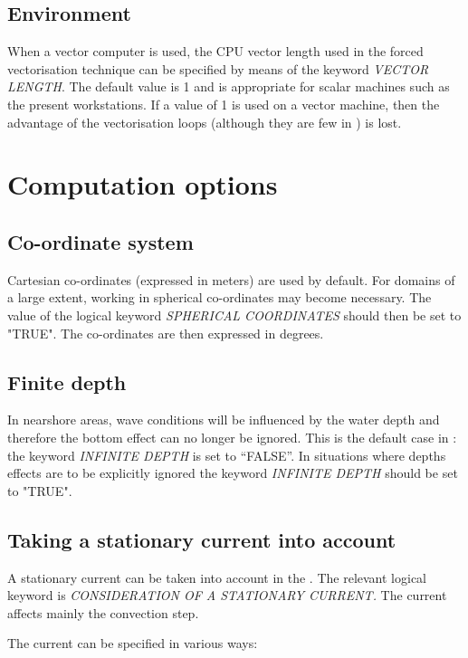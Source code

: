 \subsection{ Environment}

 When a vector computer is used, the CPU vector length used in the forced vectorisation technique can be specified by means of the keyword \textit{VECTOR LENGTH}. The default value is 1 and is appropriate for scalar machines such as the present workstations. If a value of 1 is used on a vector machine, then the advantage of the vectorisation loops (although they are few in \tomawac) is lost.


\section{ Computation options}


\subsection{ Co-ordinate system}

 Cartesian co-ordinates (expressed in meters) are used by default. For domains of a large extent, working in spherical co-ordinates may become necessary. The value of the logical keyword \textit{SPHERICAL COORDINATES} should then be set to "TRUE". The co-ordinates are then expressed in degrees.


\subsection{ Finite depth }

 In nearshore areas, wave conditions will be influenced by the water depth and therefore the bottom effect can no longer be ignored. This is the default case in \tomawac: the keyword \textit{INFINITE DEPTH }is set to ``FALSE''. In situations where depths effects are to be explicitly ignored the keyword \textit{INFINITE DEPTH} should be set to "TRUE".


\subsection{ Taking a stationary current into account}
\label{se:current}
A stationary current can be taken into account in the \tomawac. The relevant logical keyword is \textit{CONSIDERATION OF A STATIONARY
  CURRENT. }The current affects mainly the convection step.

 The current can be specified in various ways:

